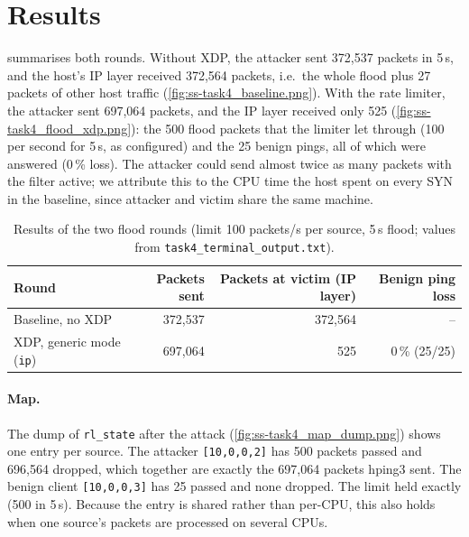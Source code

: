 \section{Results}\label{sec:t4-results}
 summarises both rounds. Without XDP, the attacker sent 372,537 packets in 5\,s, and the host's IP layer received 372,564 packets, i.e.\ the whole flood plus 27 packets of other host traffic (\cref{fig:ss-task4_baseline.png}). With the rate limiter, the attacker sent 697,064 packets, and the IP layer received only 525 (\cref{fig:ss-task4_flood_xdp.png}): the 500 flood packets that the limiter let through (100 per second for 5\,s, as configured) and the 25 benign pings, all of which were answered (0\,\% loss). The attacker could send almost twice as many packets with the filter active; we attribute this to the CPU time the host spent on every SYN in the baseline, since attacker and victim share the same machine.

\begin{table}[htbp]
	\centering\small
	\caption{Results of the two flood rounds (limit 100 packets/s per source, 5\,s flood; values from \texttt{task4\_terminal\_output.txt}).}\label{tab:t4-results}
	\begin{tabular}{lrrr}
		\toprule
		Round & Packets sent & Packets at victim (IP layer) & Benign ping loss \\
		\midrule
		Baseline, no XDP & 372,537 & 372,564 & -- \\
		XDP, generic mode (\texttt{ip}) & 697,064 & 525 & 0\,\% (25/25) \\
		\bottomrule
	\end{tabular}
\end{table}

\paragraph{Map.} The dump of \texttt{rl\_state} after the attack (\cref{fig:ss-task4_map_dump.png}) shows one entry per source. The attacker \texttt{[10,0,0,2]} has 500 packets passed and 696,564 dropped, which together are exactly the 697,064 packets hping3 sent. The benign client \texttt{[10,0,0,3]} has 25 passed and none dropped. The limit held exactly (500 in 5\,s). Because the entry is shared rather than per-CPU, this also holds when one source's packets are processed on several CPUs.


